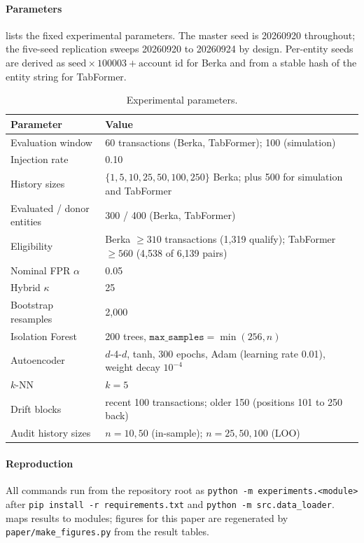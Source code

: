 \paragraph{Parameters}
 lists the fixed experimental parameters. The master seed is 20260920 throughout; the five-seed replication sweeps 20260920 to 20260924 by design. Per-entity seeds are derived as $\text{seed}\times100003+\text{account id}$ for Berka and from a stable hash of the entity string for TabFormer.

\begin{table}[!t]
\caption{Experimental parameters.}
\label{tab:params}
\centering\footnotesize\setlength{\tabcolsep}{4pt}
\begin{tabular}{p{} p{}}
\toprule
Parameter & Value \\
\midrule
Evaluation window & 60 transactions (Berka, TabFormer); 100 (simulation) \\
Injection rate & 0.10 \\
History sizes & $\{1,5,10,25,50,100,250\}$ Berka; plus 500 for simulation and TabFormer \\
Evaluated / donor entities & 300 / 400 (Berka, TabFormer) \\
Eligibility & Berka $\ge310$ transactions (1{,}319 qualify); TabFormer $\ge560$ (4{,}538 of 6{,}139 pairs) \\
Nominal FPR $\alpha$ & 0.05 \\
Hybrid $\kappa$ & 25 \\
Bootstrap resamples & 2{,}000 \\
Isolation Forest & 200 trees, $\texttt{max\_samples}=\min(256,n)$ \\
Autoencoder & $d$-4-$d$, tanh, 300 epochs, Adam (learning rate 0.01), weight decay $10^{-4}$ \\
$k$-NN & $k=5$ \\
Drift blocks & recent 100 transactions; older 150 (positions 101 to 250 back) \\
Audit history sizes & $n=10,50$ (in-sample); $n=25,50,100$ (LOO) \\
\bottomrule
\end{tabular}
\end{table}

\paragraph{Reproduction}
All commands run from the repository root as \texttt{python -m experiments.<module>} after \texttt{pip install -r requirements.txt} and \texttt{python -m src.data\_loader}.  maps results to modules; figures for this paper are regenerated by \texttt{paper/make\_figures.py} from the result tables.

